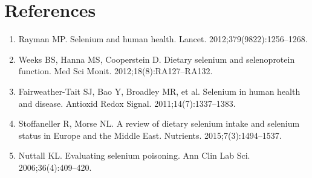 \section*{References}
\begin{enumerate}
  \item Rayman MP. Selenium and human health. Lancet. 2012;379(9822):1256--1268.
  \item Weeks BS, Hanna MS, Cooperstein D. Dietary selenium and selenoprotein function. Med Sci Monit. 2012;18(8):RA127--RA132.
  \item Fairweather-Tait SJ, Bao Y, Broadley MR, et al. Selenium in human health and disease. Antioxid Redox Signal. 2011;14(7):1337--1383.
  \item Stoffaneller R, Morse NL. A review of dietary selenium intake and selenium status in Europe and the Middle East. Nutrients. 2015;7(3):1494--1537.
  \item Nuttall KL. Evaluating selenium poisoning. Ann Clin Lab Sci. 2006;36(4):409--420.
\end{enumerate}

\clearpage
